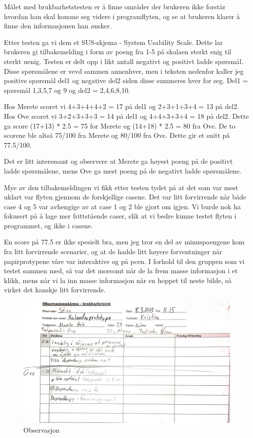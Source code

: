 Målet med brukbarhetstesten er å finne områder der brukeren ikke forstår hvordan
han skal komme seg videre i programflyten, og se at brukeren klarer å finne
den informasjonen han ønsker.

Etter testen ga vi dem et SUS-skjema - System Usability Scale. Dette lar
brukeren gi tilbakemelding i form av poeng fra 1-5 på skalaen sterkt enig til
sterkt uenig. Testen er delt opp i likt antall negativt og positivt ladde
spørsmål. Disse spørsmålene er vevd sammen annenhver, men i teksten nedenfor
kaller jeg positive spørsmål del1 og negative del2 siden disse summeres hver for
seg. Del1 = spørsmål 1,3,5,7 og 9 og del2 = 2,4,6,8,10.

Hos Merete scoret vi 4+3+4+4+2 = 17 på del1 og 2+3+1+3+4 = 13 på
del2. Hos Ove scoret vi 3+2+3+3+3 = 14 på del1 og 4+4+3+3+4 = 18 på
del2. Dette ga score (17+13) * 2.5 = 75 for Merete og (14+18) * 2.5 = 80
fra Ove. De to scorene ble altså 75/100 fra Merete og 80/100 fra Ove. Dette gir
et snitt på 77.5/100.

Det er litt interessant og observere at Merete ga høyest poeng på de positivt
ladde spørsmålene, mens Ove ga mest poeng på de negativt ladde spørsmålene.

Mye av den tilbakemeldingen vi fikk etter testen tydet på at det som var mest
uklart var flyten gjennom de forskjellige casene. Det var litt forvirrende når
både case 4 og 5 var avhengige av at case 1 og 2 ble gjort om igjen. Vi burde
nok ha fokusert på å lage mer frittstående caser, slik at vi bedre kunne testet
flyten i programmet, og ikke i casene.

En score på 77.5 er ikke spesielt bra, men jeg tror en del av minuspoengene kom
fra litt forvirrende scenarier, og at de hadde litt høyere forventninger når
papirprotypene våre var interaktive og på pcen. I forhold til den gruppen som
vi testet sammen med, så var det morsomt når de la frem masse informasjon i
et klikk, mens når vi la inn masse informasjon når en hoppet til neste bilde, så
virket det kanskje litt forvirrende.

\begin{figure}[obs]
\centering
\includegraphics[width=160mm]{images/observasjon.jpg}
\caption{Observasjon}
\label{overflow}
\end{figure}

